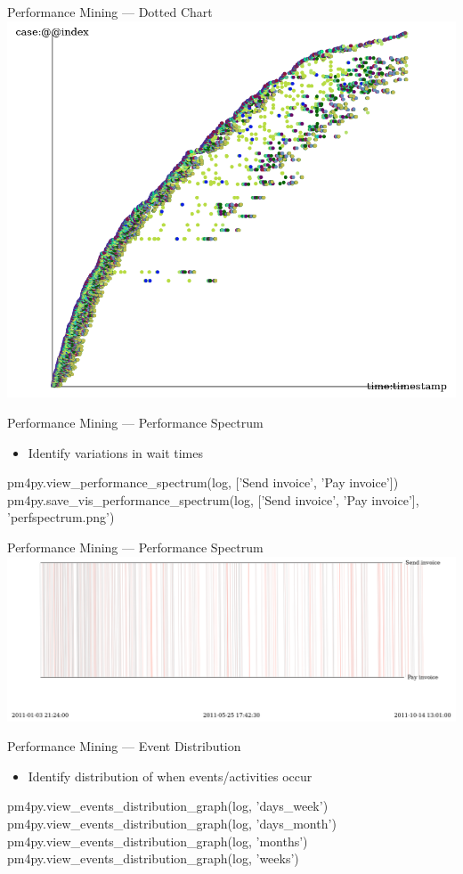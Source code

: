 \documentclass[ignorenonframetext,xcolor=x11names]{beamer}
\begin{document}
\begin{frame}{Performance Mining --- Dotted Chart}
\centering
\includegraphics[width=.8\textwidth]{dottedchart.png}
\end{frame}

\begin{frame}[fragile]{Performance Mining --- Performance Spectrum}
\begin{itemize}
   \item Identify variations in wait times
\end{itemize}
\footnotesize
\begin{pythoncode}
pm4py.view_performance_spectrum(log,
    ['Send invoice', 'Pay invoice'])
pm4py.save_vis_performance_spectrum(log,
    ['Send invoice', 'Pay invoice'],
    'perfspectrum.png') 
\end{pythoncode}
\end{frame}

\begin{frame}{Performance Mining --- Performance Spectrum}
\includegraphics[width=\textwidth]{perfspectrum.png}
\end{frame}
    
\begin{frame}[fragile]{Performance Mining --- Event Distribution}
\begin{itemize}
   \item Identify distribution of when events/activities occur
\end{itemize}
\footnotesize
\begin{pythoncode}
pm4py.view_events_distribution_graph(log, 'days_week')
pm4py.view_events_distribution_graph(log, 'days_month')
pm4py.view_events_distribution_graph(log, 'months')
pm4py.view_events_distribution_graph(log, 'weeks')
\end{pythoncode}
\end{frame}
\end{document}
